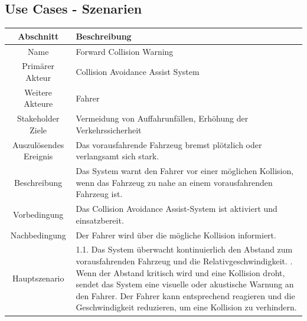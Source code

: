 \subsection{Use Cases - Szenarien}
\begin{table}[H]
	\centering
	\begin{tabular}{| c | p{11cm} |}
		\hline
		\textbf{Abschnitt} & \textbf{Beschreibung}\\
		\hline
		Name & Forward Collision Warning\\
		\hline
		Primärer Akteur & Collision Avoidance Assist System\\
		\hline
		Weitere Akteure & Fahrer\\
		\hline
		Stakeholder Ziele & Vermeidung von Auffahrunfällen, Erhöhung der Verkehrssicherheit\\
		\hline
		Auszulösendes Ereignis & Das vorausfahrende Fahrzeug bremst plötzlich oder verlangsamt sich stark.\\
		\hline
		Beschreibung & Das System warnt den Fahrer vor einer möglichen Kollision, wenn das Fahrzeug zu nahe an einem vorausfahrenden Fahrzeug ist.\\
		\hline
		Vorbedingung & Das Collision Avoidance Assist-System ist aktiviert und einsatzbereit.\\
		\hline
		Nachbedingung & Der Fahrer wird über die mögliche Kollision informiert.\\
		\hline
		Hauptszenario & 1.1. Das System überwacht kontinuierlich den Abstand zum vorausfahrenden Fahrzeug und die Relativgeschwindigkeit. \newline
						1.2. Wenn der Abstand kritisch wird und eine Kollision droht, sendet das System eine visuelle oder akustische Warnung an den Fahrer. \newline
						1.3 Der Fahrer kann entsprechend reagieren und die Geschwindigkeit reduzieren, um eine Kollision zu verhindern.\\
		\hline
	\end{tabular}
\end{table}
